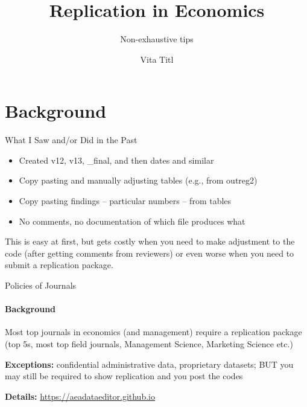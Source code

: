 \documentclass{beamer}
\title{Replication in Economics} %
\subtitle{Non-exhaustive tips} %
\author{Vita Titl}
\begin{document}
  \frame{\maketitle}

    
    


    \section{Background}
    \begin{frame}{What I Saw and/or Did in the Past}
    	\begin{itemize}
		\item Created v12, v13, \_final, and then dates and similar
		\item Copy pasting and manually adjusting tables (e.g., from outreg2)
		\item Copy pasting findings -- particular numbers -- from tables
    		\item No comments, no documentation of which file produces what
    	\end{itemize}		
	
	\bigskip
	
	This is easy at first, but gets costly when you need to make adjustment to the code (after getting comments from reviewers) or even worse when you need to submit a replication package.
    \end{frame}

    \begin{frame}{Policies of Journals}
      \framesubtitle{Background}%
      
      Most top journals in economics (and management) require a replication package (top 5s, most top field journals, Management Science, Marketing Science etc.)

      \bigskip
      
      \textbf{Exceptions:} confidential administrative data, proprietary datasets; BUT you may still be required to show replication and you post the codes
      
      \bigskip
      
      \textbf{Details:} \url{https://aeadataeditor.github.io}
      
      \end{frame}
\end{document}
